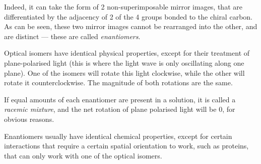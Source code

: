 
			Indeed, it can take the form of 2 non-superimposable mirror images, that are differentiated by the adjacency of 2 of
			the 4 groups bonded to the chiral carbon. As can be seen, these two mirror images cannot be rearranged into the other,
			and are distinct --- these are called \textit{enantiomers}.



			Optical isomers have identical physical properties, except for their treatment of plane-polarised light (this is
			where the light wave is only oscillating along one plane). One of the isomers will rotate this light clockwise, while the
			other will rotate it counterclockwise. The magnitude of both rotations are the same.

			If equal amounts of each enantiomer are present in a solution, it is called a \textit{racemic mixture}, and the net
			rotation of plane polarised light will be 0, for obvious reasons.

			Enantiomers usually have identical chemical properties, except for certain interactions that require a certain spatial
			orientation to work, such as proteins, that can only work with one of the optical isomers.

















